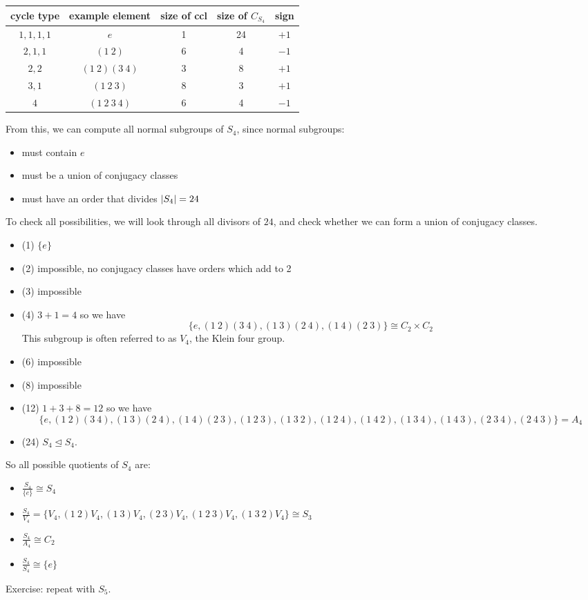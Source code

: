 \noindent\begin{tabular}{ccccc}
	cycle type  & example element  & size of ccl & size of \(C_{S_4}\) & sign   \\\midrule
	\(1,1,1,1\) & \(e\)            & 1           & 24                  & \(+1\) \\
	\(2,1,1\)   & \((1\ 2)\)       & 6           & 4                   & \(-1\) \\
	\(2,2\)     & \((1\ 2)(3\ 4)\) & 3           & 8                   & \(+1\) \\
	\(3,1\)     & \((1\ 2\ 3)\)    & 8           & 3                   & \(+1\) \\
	\(4\)       & \((1\ 2\ 3\ 4)\) & 6           & 4                   & \(-1\) \\
\end{tabular}

From this, we can compute all normal subgroups of \(S_4\), since normal subgroups:
\begin{itemize}
	\item must contain \(e\)
	\item must be a union of conjugacy classes
	\item must have an order that divides \(\abs{S_4} = 24\)
\end{itemize}
To check all possibilities, we will look through all divisors of \(24\), and check whether we can form a union of conjugacy classes.
\begin{itemize}
	\item (1) \(\{ e \}\)
	\item (2) impossible, no conjugacy classes have orders which add to 2
	\item (3) impossible
	\item (4) \(3+1=4\) so we have
	      \[
		      \{ e, (1\ 2)(3\ 4), (1\ 3)(2\ 4), (1\ 4)(2\ 3) \} \cong C_2 \times C_2
	      \]
	      This subgroup is often referred to as \(V_4\), the Klein four group.
	\item (6) impossible
	\item (8) impossible
	\item (12) \(1+3+8=12\) so we have
	      \[
		      \{ e, (1\ 2)(3\ 4), (1\ 3)(2\ 4), (1\ 4)(2\ 3), (1\ 2\ 3), (1\ 3\ 2), (1\ 2\ 4), (1\ 4\ 2), (1\ 3\ 4), (1\ 4\ 3), (2\ 3\ 4), (2\ 4\ 3) \} = A_4
	      \]
	\item (24) \(S_4 \trianglelefteq S_4\).
\end{itemize}
So all possible quotients of \(S_4\) are:
\begin{itemize}
	\item \(\frac{S_4}{\{ e \}} \cong S_4\)
	\item \(\frac{S_4}{V_4} = \{ V_4, (1\ 2)V_4, (1\ 3)V_4, (2\ 3)V_4, (1\ 2\ 3)V_4, (1\ 3\ 2)V_4 \} \cong S_3\)
	\item \(\frac{S_4}{A_4} \cong C_2\)
	\item \(\frac{S_4}{S_4} \cong \{ e \}\)
\end{itemize}
Exercise: repeat with \(S_5\).


